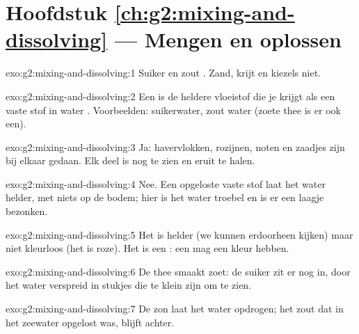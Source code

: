 \section*{Hoofdstuk \ref{ch:g2:mixing-and-dissolving} --- Mengen en oplossen}

\begin{solution}{exo:g2:mixing-and-dissolving:1}
Suiker en zout . Zand, krijt en kiezels niet.
\end{solution}

\begin{solution}{exo:g2:mixing-and-dissolving:2}
Een  is de heldere vloeistof die je krijgt als een vaste stof
in water . Voorbeelden: suikerwater, zout water (zoete thee is er
ook een).
\end{solution}

\begin{solution}{exo:g2:mixing-and-dissolving:3}
Ja: havervlokken, rozijnen, noten en zaadjes zijn bij elkaar gedaan. Elk
deel is nog te zien en eruit te halen.
\end{solution}

\begin{solution}{exo:g2:mixing-and-dissolving:4}
Nee. Een opgeloste vaste stof laat het water helder, met niets op de
bodem; hier is het water troebel en is er een laagje bezonken.
\end{solution}

\begin{solution}{exo:g2:mixing-and-dissolving:5}
Het is helder (we kunnen erdoorheen kijken) maar niet kleurloos (het is
roze). Het is een : een  mag een kleur hebben.
\end{solution}

\begin{solution}{exo:g2:mixing-and-dissolving:6}
De thee smaakt zoet: de suiker zit er nog in, door het water verspreid in
stukjes die te klein zijn om te zien.
\end{solution}

\begin{solution}{exo:g2:mixing-and-dissolving:7}
De zon laat het water opdrogen; het zout dat in het zeewater opgelost
was, blijft achter.
\end{solution}

